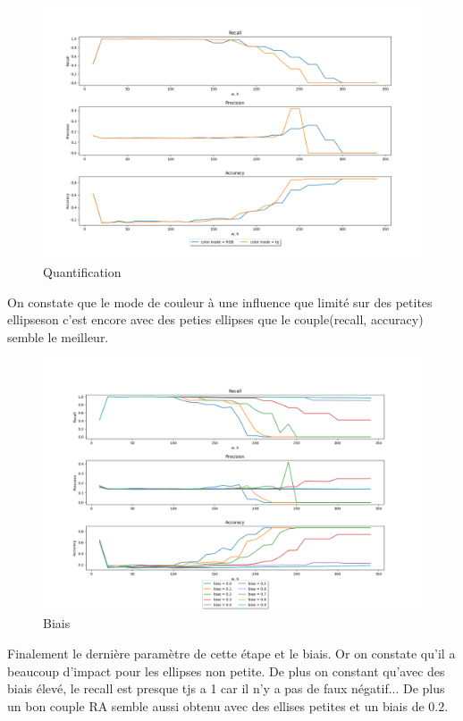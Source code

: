 \documentclass[a4paper,12pt, openany]{book}
\theoremstyle{break}
\begin{document}
\begin{figure}[H]
  \includegraphics[width=\textwidth]{images/compare_color_mode}
  \caption{Quantification}
  \label{fig:colmode}
\end{figure}

On constate que le mode de couleur à une influence que limité sur des petites ellipseson c'est encore avec des peties ellipses que le couple(recall, accuracy) semble le meilleur.

\begin{figure}[H]
  \includegraphics[width=\textwidth]{images/compare_bias}
  \caption{Biais}
  \label{fig:biais}
\end{figure}

Finalement le dernière paramètre de cette étape et le biais. Or on constate qu'il a beaucoup d'impact pour les ellipses non petite. De plus on constant qu'avec des biais élevé, le recall est presque tjs a 1 car il n'y a pas de faux négatif... De plus un bon couple RA semble aussi obtenu avec des ellises petites et un biais de $0.2$.
\end{document}
